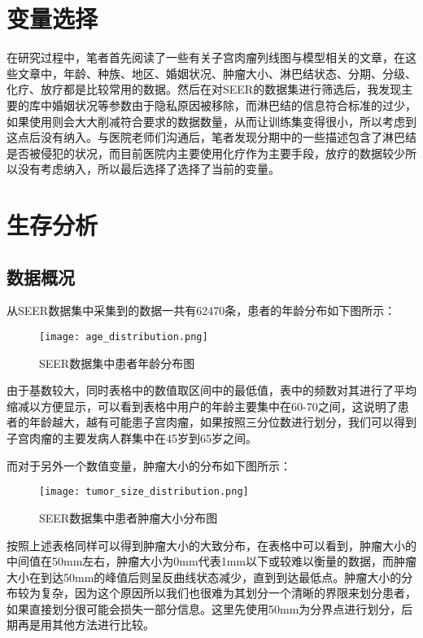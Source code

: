 \section{变量选择}

在研究过程中，笔者首先阅读了一些有关子宫肉瘤列线图与模型相关的文章\cite{novel_tool}，在这些文章中，年龄、种族、地区、婚姻状况、肿瘤大小、淋巴结状态、分期、分级、化疗、放疗都是比较常用的数据。然后在对SEER的数据集进行筛选后，我发现主要的库中婚姻状况等参数由于隐私原因被移除，而淋巴结的信息符合标准的过少，如果使用则会大大削减符合要求的数据数量，从而让训练集变得很小，所以考虑到这点后没有纳入。与医院老师们沟通后，笔者发现分期中的一些描述包含了淋巴结是否被侵犯的状况，而目前医院内主要使用化疗作为主要手段，放疗的数据较少所以没有考虑纳入，所以最后选择了选择了当前的变量。

\section{生存分析}

\subsection{数据概况}

从SEER数据集中采集到的数据一共有62470条，患者的年龄分布如下图所示：
\begin{figure}[!htbp]
    \centering
    \texttt{[image: age\_distribution.png]}
    \caption{SEER数据集中患者年龄分布图} \label{fig:age_distribution}
\end{figure}

由于基数较大，同时表格中的数值取区间中的最低值，表中的频数对其进行了平均缩减以方便显示，可以看到表格中用户的年龄主要集中在60-70之间，这说明了患者的年龄越大，越有可能患子宫肉瘤，如果按照三分位数进行划分，我们可以得到子宫肉瘤的主要发病人群集中在45岁到65岁之间。

而对于另外一个数值变量，肿瘤大小的分布如下图所示：

\begin{figure}[!htbp]
    \centering
    \texttt{[image: tumor\_size\_distribution.png]}
    \caption{SEER数据集中患者肿瘤大小分布图} \label{fig:tumor_size_distribution}
\end{figure}

按照上述表格同样可以得到肿瘤大小的大致分布，在表格中可以看到，肿瘤大小的中间值在50mm左右，肿瘤大小为0mm代表1mm以下或较难以衡量的数据，而肿瘤大小在到达50mm的峰值后则呈反曲线状态减少，直到到达最低点。肿瘤大小的分布较为复杂，因为这个原因所以我们也很难为其划分一个清晰的界限来划分患者，如果直接划分很可能会损失一部分信息。这里先使用50mm为分界点进行划分，后期再是用其他方法进行比较。

